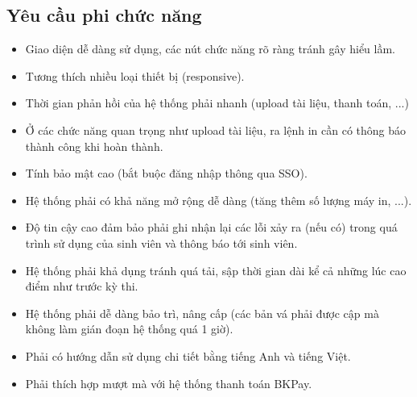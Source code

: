 \documentclass[a4paper]{article}
\begin{document}
\subsection{Yêu cầu phi chức năng}
\begin{itemize}
    \item Giao diện dễ dàng sử dụng, các nút chức năng rõ ràng tránh gây hiểu lầm.
    \item Tương thích nhiều loại thiết bị (responsive).
    \item Thời gian phản hồi của hệ thống phải nhanh (upload tài liệu, thanh toán, ...)
    \item Ở các chức năng quan trọng như upload tài liệu, ra lệnh in cần có thông báo thành công khi hoàn thành.
    \item Tính bảo mật cao (bắt buộc đăng nhập thông qua SSO).
    \item Hệ thống phải có khả năng mở rộng dễ dàng (tăng thêm số lượng máy in, ...).
    \item Độ tin cậy cao đảm bảo phải ghi nhận lại các lỗi xảy ra (nếu có) trong quá trình sử dụng của sinh viên và thông báo tới sinh viên.
    \item Hệ thống phải khả dụng tránh quá tải, sập thời gian dài kể cả những lúc cao điểm như trước kỳ thi.
    \item Hệ thống phải dễ dàng bảo trì, nâng cấp (các bản vá phải được cập mà không làm gián đoạn hệ thống quá 1 giờ).
    \item Phải có hướng dẫn sử dụng chi tiết bằng tiếng Anh và tiếng Việt.
    \item Phải thích hợp mượt mà với hệ thống thanh toán BKPay.
\end{itemize}
\newpage
\end{document}
